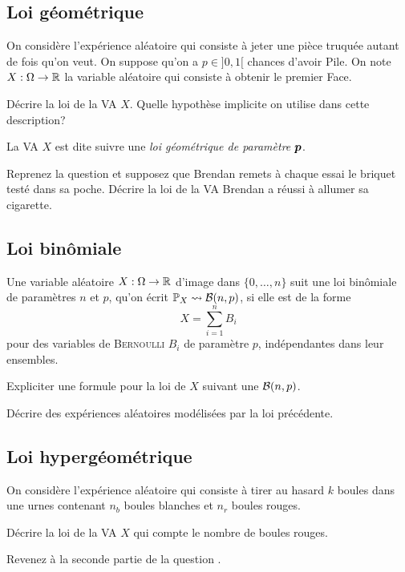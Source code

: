 \documentclass[11pt, a4paper]{article}
\begin{document}
\subsection{Loi géométrique}
\label{sec:loigéométrique}

On considère l'expérience aléatoire qui consiste à jeter une pièce
truquée autant de fois qu'on veut. On suppose qu'on a $p \in ]0, 1[$
chances d'avoir Pile. On note $X : \Omega \to \mathbb{R}$ la variable
aléatoire qui consiste à obtenir le premier Face.
\begin{question}
  Décrire la loi de la VA $X$. Quelle hypothèse implicite on utilise
  dans cette description?
\end{question}
La VA $X$ est dite suivre une \emph{loi géométrique de paramètre
  $\boldsymbol{p}$}.
\begin{question}
  Reprenez la question  et supposez que Brendan remets
  à chaque essai le briquet testé dans sa poche. Décrire la loi de la
  VA Brendan a réussi à allumer sa cigarette.
\end{question}

\subsection{Loi binômiale}
\label{sec:loibinomiale}

Une variable aléatoire $X : \Omega \to \mathbb{R}$ d'image dans
$\{0, \ldots, n\}$ suit une loi binômiale de paramètres $n$ et $p$,
qu'on écrit $\operatorname{\mathbb{P}}_X \leadsto \mathcal{B}(n, p)$, si elle est de la forme
\[
  X = \sum_{i = 1}^n B_i
\]
pour des variables de \textsc{Bernoulli} $B_i$ de paramètre $p$, indépendantes
dans leur ensembles.
\begin{question}
  Expliciter une formule pour la loi de $X$ suivant une
  $\mathcal{B}(n, p)$.
\end{question}
\begin{question}
  Décrire des expériences aléatoires modélisées par la loi précédente.
\end{question}

\subsection{Loi hypergéométrique}
\label{sec:loihypergeometrique}

On considère l'expérience aléatoire qui consiste à tirer au hasard $k$
boules dans une urnes contenant $n_b$ boules blanches et $n_r$ boules
rouges.
\begin{question}
  Décrire la loi de la VA $X$ qui compte le nombre de boules rouges.
\end{question}
\begin{question}
  Revenez à la seconde partie de la question .
\end{question}
\end{document}
